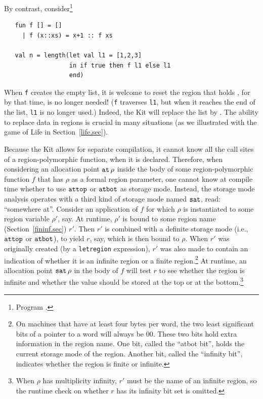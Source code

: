 \documentclass[12pt]{book}
\begin{document}
By contrast, consider\footnote{Program .}
\begin{verbatim}
   fun f [] = []
     | f (x::xs) = x+1 :: f xs

   val n = length(let val l1 = [1,2,3]
                  in if true then f l1 else l1
                  end)
\end{verbatim}
When {\tt f} creates the empty list, it is welcome to reset the region
that holds , for by that time,  is no longer
needed! ({\tt f} traverses {\tt l1}, but when it reaches the end of
the list, {\tt l1} is no longer used.)  Indeed, the Kit will replace
the list \boxml{[1,2,3]} by \boxml{[2,3,4]}. The ability to replace
data in regions is crucial in many situations (as we illustrated with
the game of Life in Section~\ref{life.sec}).

Because the Kit allows for separate compilation, it cannot know all
the call sites of a region-polymorphic function, when it is declared.
Therefore, when considering an allocation point $\mathbin{\hbox{\tt at}}\,\rho$ inside the
body of some region-polymorphic function $f$ that has $\rho$ as a
formal region parameter, one cannot know at compile time whether to
use $\hbox{\tt attop}$ or $\hbox{\tt atbot}$ as storage mode.  Instead, the storage mode
analysis operates with a third kind of storage mode named $\hbox{\tt sat}$,
read: ``somewhere at''. Consider an application of $f$ for which
$\rho$ is instantiated to some region variable $\rho'$, say. At
runtime, $\rho'$ is bound to some region name
(Section~\ref{fininf.sec}) $r'$.  Then $r'$ is combined with a
definite storage mode (i.e., $\hbox{\tt attop}$ or $\hbox{\tt atbot}$), to yield $r$, say,
which is then bound to $\rho$.  When $r'$ was originally created (by a
{\tt letregion} expression), $r'$ was also made to contain an
indication of whether it is an infinite region or a finite
region.\footnote{On machines\label{atbit.lab} that have at least four
  bytes per word, the two least significant bits of a pointer to a
  word will always be 00. These two bits hold extra information in the
  region name.  One bit, called the ``atbot bit'', holds the current
  storage mode of the region. Another bit, called the ``infinity
  bit'', indicates whether the region is finite or infinite.}  At
runtime, an allocation point $\hbox{\tt sat}\,\rho$ in the body of $f$ will test
$r$ to see whether the region is infinite and whether the value should
be stored at the top or at the bottom.\footnote{When $\rho$ has
  multiplicity infinity, $r'$ must be the name of an infinite region,
  so the runtime check on whether $r$ has its infinity bit set is
  omitted.}
\end{document}
